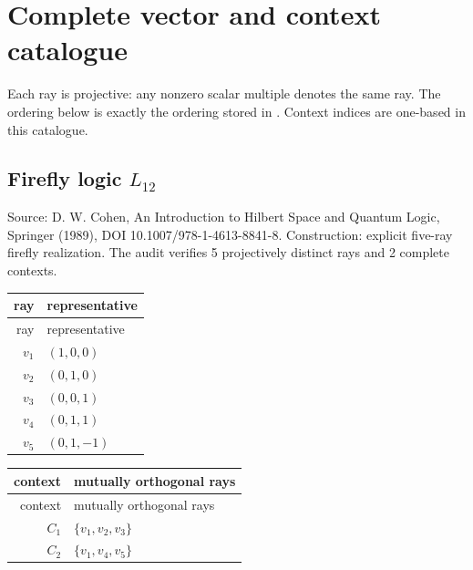 \section{Complete vector and context catalogue}
\label{sec:complete-catalogue}
Each ray is projective: any nonzero scalar multiple denotes the same ray. The ordering below is exactly the ordering stored in .  Context indices are one-based in this catalogue.
\subsection{Firefly logic \texorpdfstring{$L_{12}$}{L12}}
\begingroup\sloppy Source: D. W. Cohen, An Introduction to Hilbert Space and Quantum Logic, Springer (1989), DOI 10.1007/978-1-4613-8841-8.  Construction: explicit five-ray firefly realization. The audit verifies 5 projectively distinct rays and 2 complete contexts.\par\endgroup
\begin{longtable}{@{}r l@{}}
\toprule
ray & representative\\
\midrule
\endfirsthead
\toprule
ray & representative\\
\midrule
\endhead
$v_{1}$ & $(1,0,0)$\\
$v_{2}$ & $(0,1,0)$\\
$v_{3}$ & $(0,0,1)$\\
$v_{4}$ & $(0,1,1)$\\
$v_{5}$ & $(0,1,-1)$\\
\bottomrule
\end{longtable}
\begin{longtable}{@{}r l@{}}
\toprule
context & mutually orthogonal rays\\
\midrule
\endfirsthead
\toprule
context & mutually orthogonal rays\\
\midrule
\endhead
$C_{1}$ & $\{v_{1},v_{2},v_{3}\}$\\
$C_{2}$ & $\{v_{1},v_{4},v_{5}\}$\\
\bottomrule
\end{longtable}
